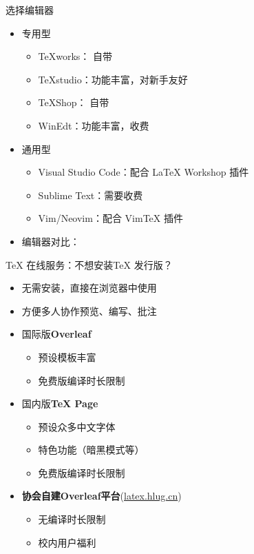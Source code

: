 \begin{frame}{选择编辑器}
\begin{itemize}
  \item<+-> 专用型
    \begin{itemize}
      \item \TeX{}works：\TeXLive{} 自带 \faWindows{} \faApple{} \faLinux{}
      \item \TeX{}studio：功能丰富，对新手友好 \faWindows{} \faApple{} \faLinux{}
      \item \TeX{}Shop：\MacTeX{} 自带 \faApple{}
      \item WinEdt：功能丰富，收费 \faWindows{}
    \end{itemize}

  \item<+-> 通用型
    \begin{itemize}
      \item Visual Studio Code：配合 LaTeX Workshop 插件
      \item Sublime Text：需要收费
      \item Vim/Neovim：配合 Vim\TeX{} 插件
    \end{itemize}

  \item<+-> 编辑器对比：
\end{itemize}
\end{frame}

\begin{frame}{\TeX{} 在线服务：不想安装\TeX{} 发行版？}
  \begin{itemize}
    \item 无需安装，直接在浏览器中使用
    \item<+-> 方便多人协作预览、编写、批注
    \item<+-> 国际版\textbf{Overleaf} 
      \begin{itemize}
        \item 预设模板丰富
        \item 免费版编译时长限制
      \end{itemize}
    \item<+-> 国内版\textbf{\TeX{} Page} 
      \begin{itemize}
        \item 预设众多中文字体
        \item 特色功能（暗黑模式等）
        \item 免费版编译时长限制
      \end{itemize}
    \item<+-> \textbf{协会自建Overleaf平台}(\url{latex.hlug.cn})
      \begin{itemize}
        \item 无编译时长限制
        \item 校内用户福利
      \end{itemize}
  \end{itemize}
\end{frame}

